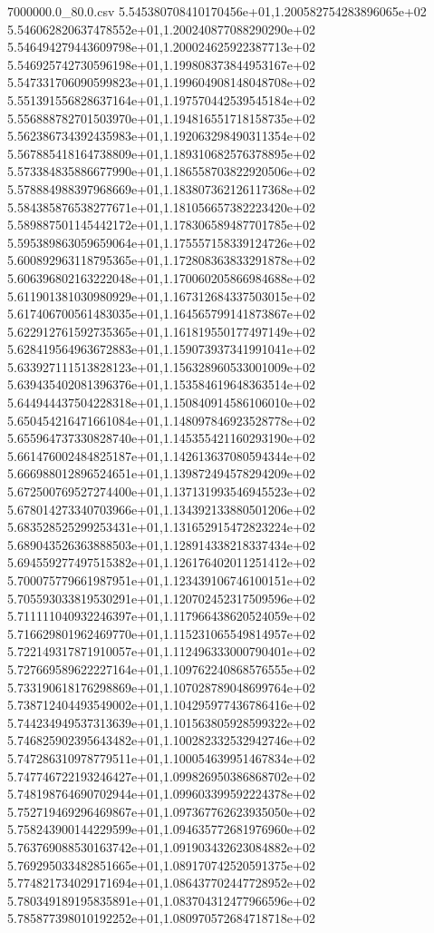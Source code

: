 \begin{filecontents*}{7000000.0_80.0.csv}
5.545380708410170456e+01,1.200582754283896065e+02
5.546062820637478552e+01,1.200240877088290290e+02
5.546494279443609798e+01,1.200024625922387713e+02
5.546925742730596198e+01,1.199808373844953167e+02
5.547331706090599823e+01,1.199604908148048708e+02
5.551391556828637164e+01,1.197570442539545184e+02
5.556888782701503970e+01,1.194816551718158735e+02
5.562386734392435983e+01,1.192063298490311354e+02
5.567885418164738809e+01,1.189310682576378895e+02
5.573384835886677990e+01,1.186558703822920506e+02
5.578884988397968669e+01,1.183807362126117368e+02
5.584385876538277671e+01,1.181056657382223420e+02
5.589887501145442172e+01,1.178306589487701785e+02
5.595389863059659064e+01,1.175557158339124726e+02
5.600892963118795365e+01,1.172808363833291878e+02
5.606396802163222048e+01,1.170060205866984688e+02
5.611901381030980929e+01,1.167312684337503015e+02
5.617406700561483035e+01,1.164565799141873867e+02
5.622912761592735365e+01,1.161819550177497149e+02
5.628419564963672883e+01,1.159073937341991041e+02
5.633927111513828123e+01,1.156328960533001009e+02
5.639435402081396376e+01,1.153584619648363514e+02
5.644944437504228318e+01,1.150840914586106010e+02
5.650454216471661084e+01,1.148097846923528778e+02
5.655964737330828740e+01,1.145355421160293190e+02
5.661476002484825187e+01,1.142613637080594344e+02
5.666988012896524651e+01,1.139872494578294209e+02
5.672500769527274400e+01,1.137131993546945523e+02
5.678014273340703966e+01,1.134392133880501206e+02
5.683528525299253431e+01,1.131652915472823224e+02
5.689043526363888503e+01,1.128914338218337434e+02
5.694559277497515382e+01,1.126176402011251412e+02
5.700075779661987951e+01,1.123439106746100151e+02
5.705593033819530291e+01,1.120702452317509596e+02
5.711111040932246397e+01,1.117966438620524059e+02
5.716629801962469770e+01,1.115231065549814957e+02
5.722149317871910057e+01,1.112496333000790401e+02
5.727669589622227164e+01,1.109762240868576555e+02
5.733190618176298869e+01,1.107028789048699764e+02
5.738712404493549002e+01,1.104295977436786416e+02
5.744234949537313639e+01,1.101563805928599322e+02
5.746825902395643482e+01,1.100282332532942746e+02
5.747286310978779511e+01,1.100054639951467834e+02
5.747746722193246427e+01,1.099826950386868702e+02
5.748198764690702944e+01,1.099603399592224378e+02
5.752719469296469867e+01,1.097367762623935050e+02
5.758243900144229599e+01,1.094635772681976960e+02
5.763769088530163742e+01,1.091903432623084882e+02
5.769295033482851665e+01,1.089170742520591375e+02
5.774821734029171694e+01,1.086437702447728952e+02
5.780349189195835891e+01,1.083704312477966596e+02
5.785877398010192252e+01,1.080970572684718718e+02

\end{filecontents*}
